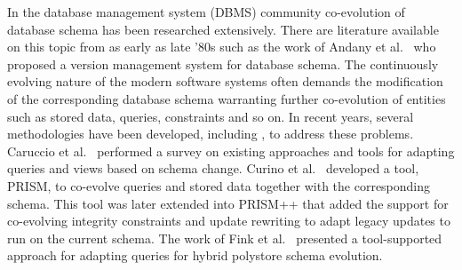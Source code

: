 In the database management system (DBMS) community co-evolution of database schema has been researched extensively. There are literature available on this topic from as early as late '80s such as the work of Andany et al.~\autocite{andany1991management} who proposed a version management system for database schema. The continuously evolving nature of the modern software systems often demands the modification of the corresponding database schema warranting further co-evolution of entities such as stored data, queries, constraints and so on. In recent years, several methodologies have been developed, including \autocite{younggook2005, HICK2006534, curino2010, Curino2008}, to address these problems. Caruccio et al.~\autocite{Caruccio2016} performed a survey on existing approaches and tools for adapting queries and views based on schema change. Curino et al.~\cite{Curino2008} developed a tool, PRISM, to co-evolve queries and stored data together with the corresponding schema. This tool was later extended into PRISM++ that added the support for co-evolving integrity constraints and update rewriting to adapt legacy updates to run on the current schema. The work of Fink et al.~\autocite{Fink2020} presented a tool-supported approach for adapting queries for hybrid polystore schema evolution. 



